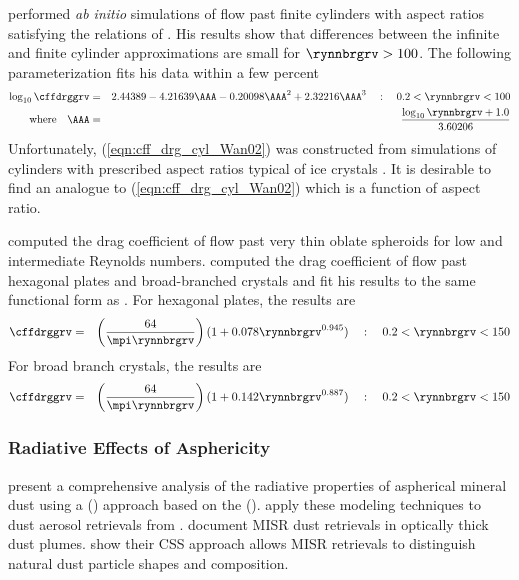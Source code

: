 \documentclass[12pt,twoside]{book}
\begin{document}
\cite{Wan02} performed \textit{ab initio} simulations of flow past
finite cylinders with aspect ratios satisfying the relations of
\cite{AuV70}. 
His results show that differences between the infinite and finite
cylinder approximations are small for $\rynnbrgrv > 100$.
The following parameterization fits his data within a few percent
\begin{eqnarray}
\log_{10} \cffdrggrv & = & 2.44389 - 4.21639\AAA -
0.20098\AAA^{2}+2.32216\AAA^{3} 
\quad : \quad 0.2 < \rynnbrgrv < 100 \\
\mbox{where} \quad \AAA & = & \frac{\log_{10}\rynnbrgrv+1.0}{3.60206}
\label{eqn:cff_drg_cyl_Wan02}
\end{eqnarray}
Unfortunately, (\ref{eqn:cff_drg_cyl_Wan02}) was constructed
from simulations of cylinders with prescribed aspect ratios 
typical of ice crystals \cite[][p.~53]{Wan02}.
It is desirable to find an analogue to (\ref{eqn:cff_drg_cyl_Wan02})  
which is a function of aspect ratio.

\cite{PPH73} computed the drag coefficient of flow past very thin
oblate spheroids for low and intermediate Reynolds numbers.
\cite{Wan02} computed the drag coefficient of flow past hexagonal
plates and broad-branched crystals and fit his results to the same
functional form as \citeauthor{PPH73}.
For hexagonal plates, the results are
\begin{eqnarray}
\cffdrggrv & = & \left( \frac{64}{\mpi \rynnbrgrv} \right)
(1 + 0.078 \rynnbrgrv^{0.945}) 
\quad : \quad 0.2 < \rynnbrgrv < 150 
\label{eqn:cff_drg_plt_hxg_Wan02}
\end{eqnarray}
For broad branch crystals, the results are
\begin{eqnarray}
\cffdrggrv & = & \left( \frac{64}{\mpi \rynnbrgrv} \right)
(1 + 0.142 \rynnbrgrv^{0.887}) 
\quad : \quad 0.2 < \rynnbrgrv < 150 
\label{eqn:cff_drg_plt_bbc_Wan02}
\end{eqnarray}

\subsubsection[Radiative Effects of Asphericity]{Radiative Effects of Asphericity}\label{sxn:asp_rdn}
\cite{KaS04} present a comprehensive analysis of the radiative
properties of aspherical mineral dust using a
 () approach based on the
 ().
\cite{KDK05} apply these modeling techniques to dust aerosol
retrievals from .
\cite{KKS05} document MISR dust retrievals in optically thick dust
plumes.
\cite{KKL05} show their CSS approach allows MISR retrievals to
distinguish natural dust particle shapes and composition.
\end{document}
